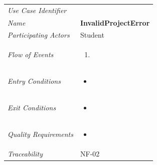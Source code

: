 \documentclass[12pt,letterpaper]{article}
\begin{document}
\begin{center}
	\begin{tabu} to 
		\toprule
		Use Case Identifier & \invalidprojecterror{} \\
		Name & {\bf InvalidProjectError} \\
		Participating Actors & Student \\
		Flow of Events & 
	    \begin{enumerate}[topsep=-1em, leftmargin=*]
		    \item 
		\end{enumerate} \\

		Entry Conditions &
		\begin{itemize}[topsep=-1em, leftmargin=*]
		    \item 
        \end{itemize} \\

		Exit Conditions &
		\begin{itemize}[topsep=-1em, leftmargin=*]
		    \item 
        \end{itemize} \\

		Quality Requirements &
		\begin{itemize}[topsep=-1em, leftmargin=*]
		    \item 
        \end{itemize} \\

		Traceability & NF-02 \\
		\toprule
	\end{tabu}
\end{center}
\end{document}
